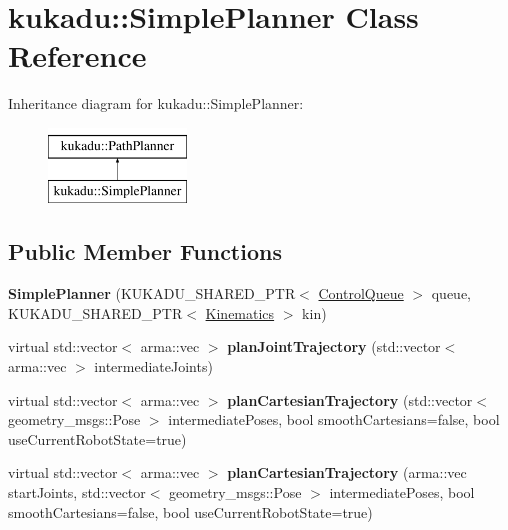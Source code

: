 \hypertarget{classkukadu_1_1SimplePlanner}{\section{kukadu\-:\-:Simple\-Planner Class Reference}
\label{classkukadu_1_1SimplePlanner}
}
Inheritance diagram for kukadu\-:\-:Simple\-Planner\-:\begin{figure}[H]
\begin{center}
\leavevmode
\includegraphics[height=2.000000cm]{classkukadu_1_1SimplePlanner}
\end{center}
\end{figure}
\subsection*{Public Member Functions}
\begin{DoxyCompactItemize}
\item 
\hypertarget{classkukadu_1_1SimplePlanner_ae04d46cf022851954671dca51f8700f9}{{\bfseries Simple\-Planner} (K\-U\-K\-A\-D\-U\-\_\-\-S\-H\-A\-R\-E\-D\-\_\-\-P\-T\-R$<$ \hyperlink{classkukadu_1_1ControlQueue}{Control\-Queue} $>$ queue, K\-U\-K\-A\-D\-U\-\_\-\-S\-H\-A\-R\-E\-D\-\_\-\-P\-T\-R$<$ \hyperlink{classkukadu_1_1Kinematics}{Kinematics} $>$ kin)}\label{classkukadu_1_1SimplePlanner_ae04d46cf022851954671dca51f8700f9}

\item 
\hypertarget{classkukadu_1_1SimplePlanner_ae47217c2e300e1b510f4c9fd7325fedc}{virtual std\-::vector$<$ arma\-::vec $>$ {\bfseries plan\-Joint\-Trajectory} (std\-::vector$<$ arma\-::vec $>$ intermediate\-Joints)}\label{classkukadu_1_1SimplePlanner_ae47217c2e300e1b510f4c9fd7325fedc}

\item 
\hypertarget{classkukadu_1_1SimplePlanner_aad7a23553297e05123565c99ac773d01}{virtual std\-::vector$<$ arma\-::vec $>$ {\bfseries plan\-Cartesian\-Trajectory} (std\-::vector$<$ geometry\-\_\-msgs\-::\-Pose $>$ intermediate\-Poses, bool smooth\-Cartesians=false, bool use\-Current\-Robot\-State=true)}\label{classkukadu_1_1SimplePlanner_aad7a23553297e05123565c99ac773d01}

\item 
\hypertarget{classkukadu_1_1SimplePlanner_aaef70f4952f29e543e1c2ade53c8381d}{virtual std\-::vector$<$ arma\-::vec $>$ {\bfseries plan\-Cartesian\-Trajectory} (arma\-::vec start\-Joints, std\-::vector$<$ geometry\-\_\-msgs\-::\-Pose $>$ intermediate\-Poses, bool smooth\-Cartesians=false, bool use\-Current\-Robot\-State=true)}\label{classkukadu_1_1SimplePlanner_aaef70f4952f29e543e1c2ade53c8381d}

\end{DoxyCompactItemize}
